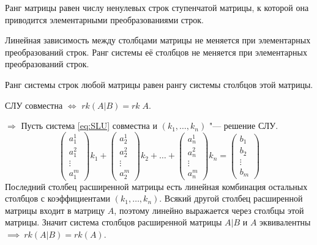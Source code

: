 \begin{theorem}
    Ранг матрицы равен числу ненулевых строк ступенчатой матрицы, к которой она приводится элементарными преобразованиями строк.
\end{theorem}

Линейная зависимость между столбцами матрицы не меняется при элементарных преобразований строк. Ранг системы её столбцов не меняется при элементарных преобразований строк.

Ранг системы строк любой матрицы равен рангу системы столбцов этой матрицы.

\begin{theorem}
    СЛУ совместна $\Leftrightarrow$  $rk(A|B) = rk\;A$.
\end{theorem}
\begin{Proof}
$\Rightarrow$ Пусть система \ref{eq:SLU} совместна и $(k_1,\ldots, k_n)$ "--- решение СЛУ.
\begin{equation*}
    \begin{pmatrix}
        a_1^1 \\
        a_1^2 \\
        \vdots \\
        a_1^m
    \end{pmatrix} k_1 +
    \begin{pmatrix}
        a_2^1 \\
        a_2^2 \\
        \vdots \\
        a_2^m
    \end{pmatrix} k_2 + \ldots + 
    \begin{pmatrix}
        a_n^1 \\
        a_n^2 \\
        \vdots \\
        a_n^m
    \end{pmatrix} k_n = 
    \begin{pmatrix}
        b_1 \\
        b_2 \\
        \vdots \\
        b_m
    \end{pmatrix}
\end{equation*}
Последний столбец расширенной матрицы есть линейная комбинация остальных столбцов с коэффициентами $(k_1,\ldots,k_n)$. Всякий другой столбец расширенной матрицы входит в матрицу $A$, поэтому линейно выражается через столбцы этой матрицы. Значит система столбцов расширенной матрицы $A|B$ и $A$ эквивалентны  $\implies ~ rk(A|B) =  rk(A)$.


\end{Proof}
